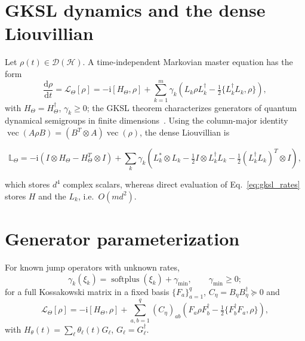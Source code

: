 \documentclass[twocolumn,aps,prxquantum,superscriptaddress,nofootinbib,floatfix,longbibliography]{revtex4-2}
\DeclareMathOperator{\softplus}{softplus}
\newcommand{\calD}{\mathcal{D}}
\newcommand{\calL}{\mathcal{L}}
\newcommand{\dd}{\mathrm{d}}
\newcommand{\ii}{\mathrm{i}}
\newcommand{\hilb}{\mathcal{H}}
\begin{document}
\section{GKSL dynamics and the dense Liouvillian}
\label{sec:gksl}
Let $\rho(t)\in\calD(\hilb)$. A time-independent Markovian master equation has the form
\begin{equation}
    \frac{\dd\rho}{\dd t}=\calL_\Theta[\rho]=-\ii[H_\Theta,\rho]+\sum_{k=1}^{m}\gamma_k\!\left(L_k\rho L_k^\dagger-\tfrac12\{L_k^\dagger L_k,\rho\}\right),
    \label{eq:gksl_rates}
\end{equation}
with $H_\Theta=H_\Theta^\dagger$, $\gamma_k\ge0$; the GKSL theorem characterizes generators of quantum dynamical semigroups in finite dimensions~\cite{lindblad1976generators,gorini1976completely,breuer2002theory,wiseman2009quantum}. Using the column-major identity $\operatorname{vec}(A\rho B)=(B^T\otimes A)\operatorname{vec}(\rho)$, the dense Liouvillian is
\begin{widetext}
\begin{equation}
    \mathbb{L}_\Theta=-\ii(I\otimes H_\Theta-H_\Theta^T\otimes I)+\sum_k\gamma_k\!\left(L_k^*\otimes L_k-\tfrac12 I\otimes L_k^\dagger L_k-\tfrac12 (L_k^\dagger L_k)^T\otimes I\right),
    \label{eq:dense_liouvillian}
\end{equation}
\end{widetext}
which stores $d^4$ complex scalars, whereas direct evaluation of Eq.~\eqref{eq:gksl_rates} stores $H$ and the $L_k$, i.e.\ $O(md^2)$.

\section{Generator parameterization}
\label{sec:generator_parameterization}
For known jump operators with unknown rates,
\begin{equation}
    \gamma_k(\xi_k)=\softplus(\xi_k)+\gamma_{\min},\qquad\gamma_{\min}\ge0;
    \label{eq:softplus_rates}
\end{equation}
for a full Kossakowski matrix in a fixed basis $\{F_a\}_{a=1}^{q}$, $C_\eta=B_\eta B_\eta^\dagger\succeq0$ and
\begin{equation}
    \calL_\Theta[\rho]=-\ii[H_\Theta,\rho]+\sum_{a,b=1}^{q}(C_\eta)_{ab}\!\left(F_a\rho F_b^\dagger-\tfrac12\{F_b^\dagger F_a,\rho\}\right),
    \label{eq:kossakowski_generator}
\end{equation}
with $H_\theta(t)=\sum_\ell\theta_\ell(t)G_\ell$, $G_\ell=G_\ell^\dagger$.
\end{document}
